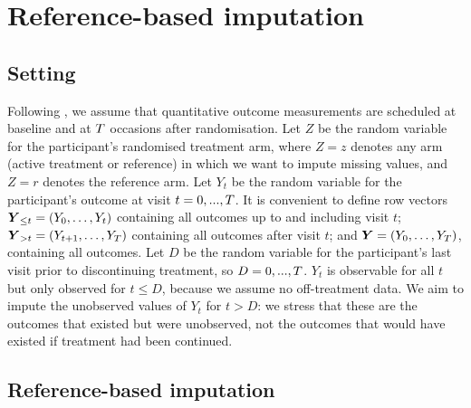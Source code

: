 
\section{Reference-based imputation}

\subsection{Setting} 
Following \citet{ian:RBIcausal},
we assume that quantitative outcome measurements are scheduled at baseline and at $T$ occasions after randomisation. 
Let $Z$ be the random variable for the participant's randomised treatment arm, where $Z=z$ denotes any arm (active treatment or reference) in which we want to impute missing values, and $Z=r$ denotes the reference arm.
Let $Y_t$ be the random variable for the participant's outcome at visit $t=0,...,T$. 
It is convenient to define row vectors
$\boldsymbol{Y}_{{\le{t}}}=(Y_0,\ldots,Y_t)$ containing all outcomes up to  and including visit $t$; 
$\boldsymbol{Y}_{{>t}}=(Y_{t+1},\ldots,Y_T)$ containing all outcomes after visit $t$; 
and
$\boldsymbol{Y}=(Y_0,\ldots,Y_T)$, containing all outcomes.
Let $D$ be the random variable for the participant's last visit prior to discontinuing treatment, so $D=0,...,T$.
$Y_t$ is observable for all $t$ but only observed for $t \le D$, because we assume no off-treatment data. 
We aim to impute the unobserved values of $Y_t$ for $t>D$: we stress that these are the outcomes that existed but were unobserved, not the outcomes that would have existed if treatment had been continued.


\subsection{Reference-based imputation}

